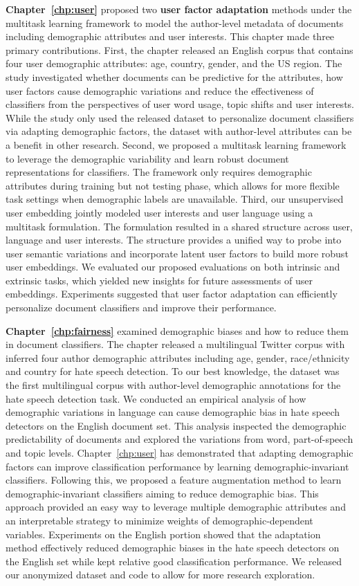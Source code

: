 \textbf{Chapter~\ref{chp:user}} proposed two \textbf{user factor adaptation} methods under the multitask learning framework to model the author-level metadata of documents including demographic attributes and user interests.
This chapter made three primary contributions. 
First, the chapter released an English corpus that contains four user demographic attributes: age, country, gender, and the US region. 
The study investigated whether documents can be predictive for the attributes, how user factors cause demographic variations and reduce the effectiveness of classifiers from the perspectives of user word usage, topic shifts and user interests.
While the study only used the released dataset to personalize document classifiers via adapting demographic factors, the dataset with author-level attributes can be a benefit in other research.
Second, we proposed a multitask learning framework to leverage the demographic variability and learn robust document representations for classifiers. 
The framework only requires demographic attributes during training but not testing phase, which allows for more flexible task settings when demographic labels are unavailable. 
Third, our unsupervised user embedding jointly modeled user interests and user language using a multitask formulation.
The formulation resulted in a shared structure across user, language and user interests.
The structure provides a unified way to probe into user semantic variations and incorporate latent user factors to build more robust user embeddings. 
We evaluated our proposed evaluations on both intrinsic and extrinsic tasks, which yielded new insights for future assessments of user embeddings. 
Experiments suggested that user factor adaptation can efficiently personalize document classifiers and improve their performance.

\textbf{Chapter~\ref{chp:fairness}} examined demographic biases and how to reduce them in document classifiers. 
The chapter released a multilingual Twitter corpus with inferred four author demographic attributes including age, gender, race/ethnicity and country for hate speech detection.
To our best knowledge, the dataset was the first multilingual corpus with author-level demographic annotations for the hate speech detection task. 
We conducted an empirical analysis of how demographic variations in language can cause demographic bias in hate speech detectors on the English document set.
This analysis inspected the demographic predictability of documents and explored the variations from word, part-of-speech and topic levels.
Chapter~\ref{chp:user} has demonstrated that adapting demographic factors can improve classification performance by learning demographic-invariant classifiers.
Following this, we proposed a feature augmentation method to learn demographic-invariant classifiers aiming to reduce demographic bias.
This approach provided an easy way to leverage multiple demographic attributes and an interpretable strategy to minimize weights of demographic-dependent variables. 
Experiments on the English portion showed that the adaptation method effectively reduced demographic biases in the hate speech detectors on the English set while kept relative good classification performance. 
We released our anonymized dataset and code to allow for more research exploration.

